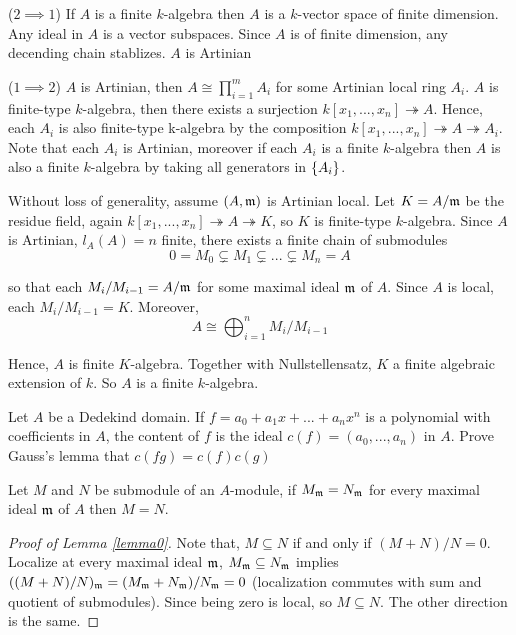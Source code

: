 \begin{longproof}
	($2 \implies 1$) If $A$ is a finite $k$-algebra then $A$ is a $k$-vector space of finite dimension. Any ideal in $A$ is a vector subspaces. Since $A$ is of finite dimension, any decending chain stablizes. $A$ is Artinian
	
	($1 \implies 2$) $A$ is Artinian, then $A \cong \prod_{i=1}^m A_i$ for some Artinian local ring $A_i$. $A$ is finite-type $k$-algebra, then there exists a surjection $k[x_1, ..., x_n] \twoheadrightarrow A$. Hence, each $A_i$ is also finite-type k-algebra by the composition $k[x_1, ..., x_n] \twoheadrightarrow A \twoheadrightarrow A_i$. Note that each $A_i$ is Artinian, moreover if each $A_i$ is a finite $k$-algebra then $A$ is also a finite $k$-algebra by taking all generators in $\{A_i\}$.
	
	Without loss of generality, assume $(A, \mathfrak{m})$ is Artinian local. Let $K = A / \mathfrak{m}$ be the residue field, again $k[x_1, ..., x_n] \twoheadrightarrow A \twoheadrightarrow K$, so $K$ is finite-type $k$-algebra. Since $A$ is Artinian, $l_A(A) = n$ finite, there exists a finite chain of submodules
	$$
		0 = M_0 \subsetneq M_1 \subsetneq ... \subsetneq M_n = A
	$$ 
	
	so that each $M_i / M_{i-1} = A / \mathfrak{m}$ for some maximal ideal $\mathfrak{m}$ of $A$. Since $A$ is local, each $M_i / M_{i-1} = K$. Moreover, 
	$$
		A \cong \bigoplus_{i=1}^n M_i / M_{i-1}
	$$
	
	Hence, $A$ is finite $K$-algebra. Together with Nullstellensatz, $K$ a finite algebraic extension of $k$. So $A$ is a finite $k$-algebra.
\end{longproof}

\begin{problem}
	Let $A$ be a Dedekind domain. If $f = a_0 + a_1 x + ... + a_n x^n$ is a polynomial with coefficients in $A$, the content of $f$ is the ideal $c(f) = (a_0, ..., a_n)$ in $A$. Prove Gauss's lemma that $c(fg) = c(f) c(g)$
\end{problem}

\begin{lemma}
	\label{lemma0}
	Let $M$ and $N$ be submodule of an $A$-module, if $M_{\mathfrak{m}} = N_{\mathfrak{m}}$ for every maximal ideal $\mathfrak{m}$ of $A$ then $M = N$.
\end{lemma}

\begin{proof}[Proof of Lemma \ref{lemma0}]
	Note that, $M \subseteq N$ if and only if $(M + N) / N = 0$. Localize at every maximal ideal $\mathfrak{m}$, $M_{\mathfrak{m}} \subseteq N_{\mathfrak{m}}$ implies $((M + N) / N)_{\mathfrak{m}} = (M_{\mathfrak{m}} + N_{\mathfrak{m}}) / N_{\mathfrak{m}} = 0$ (localization commutes with sum and quotient of submodules). Since being zero is local, so $M \subseteq N$. The other direction is the same.
\end{proof}

